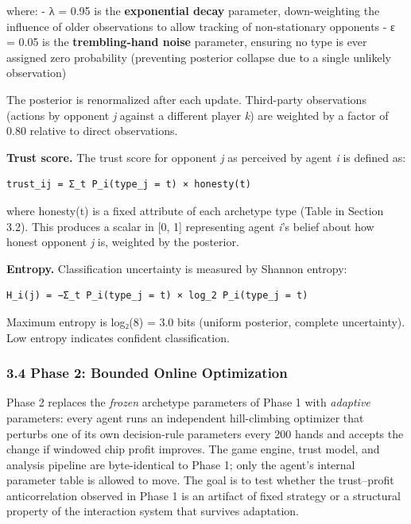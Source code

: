 \documentclass[
]{article}
\begin{document}
where: - λ = 0.95 is the \textbf{exponential decay} parameter,
down-weighting the influence of older observations to allow tracking of
non-stationary opponents - ε = 0.05 is the \textbf{trembling-hand noise}
parameter, ensuring no type is ever assigned zero probability
(preventing posterior collapse due to a single unlikely observation)

The posterior is renormalized after each update. Third-party
observations (actions by opponent \emph{j} against a different player
\emph{k}) are weighted by a factor of 0.80 relative to direct
observations.

\textbf{Trust score.} The trust score for opponent \emph{j} as perceived
by agent \emph{i} is defined as:

\begin{verbatim}
trust_ij = Σ_t P_i(type_j = t) × honesty(t)
\end{verbatim}

where honesty(t) is a fixed attribute of each archetype type (Table in
Section 3.2). This produces a scalar in {[}0, 1{]} representing agent
\emph{i}'s belief about how honest opponent \emph{j} is, weighted by the
posterior.

\textbf{Entropy.} Classification uncertainty is measured by Shannon
entropy:

\begin{verbatim}
H_i(j) = −Σ_t P_i(type_j = t) × log_2 P_i(type_j = t)
\end{verbatim}

Maximum entropy is log₂(8) = 3.0 bits (uniform posterior, complete
uncertainty). Low entropy indicates confident classification.

\hypertarget{phase-2-bounded-online-optimization}{%
\subsubsection{3.4 Phase 2: Bounded Online
Optimization}\label{phase-2-bounded-online-optimization}}

Phase 2 replaces the \emph{frozen} archetype parameters of Phase 1 with
\emph{adaptive} parameters: every agent runs an independent
hill-climbing optimizer that perturbs one of its own decision-rule
parameters every 200 hands and accepts the change if windowed chip
profit improves. The game engine, trust model, and analysis pipeline are
byte-identical to Phase 1; only the agent's internal parameter table is
allowed to move. The goal is to test whether the trust--profit
anticorrelation observed in Phase 1 is an artifact of fixed strategy or
a structural property of the interaction system that survives
adaptation.
\end{document}
